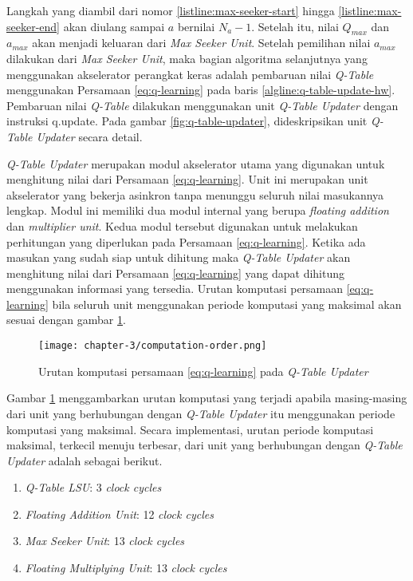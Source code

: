 Langkah yang diambil dari nomor \ref{listline:max-seeker-start} hingga \ref{listline:max-seeker-end} akan diulang sampai $a$ bernilai $N_a - 1$. Setelah itu, nilai $Q_{max}$ dan $a_{max}$ akan menjadi keluaran dari \textit{Max Seeker Unit}. Setelah pemilihan nilai $a_{max}$ dilakukan dari \textit{Max Seeker Unit}, maka bagian algoritma selanjutnya yang menggunakan akselerator perangkat keras adalah pembaruan nilai \textit{Q-Table} menggunakan Persamaan \ref{eq:q-learning} pada baris \ref{algline:q-table-update-hw}. Pembaruan nilai \textit{Q-Table} dilakukan menggunakan unit \textit{Q-Table Updater} dengan instruksi q.update. Pada gambar \ref{fig:q-table-updater}, dideskripsikan unit \textit{Q-Table Updater} secara detail.

\textit{Q-Table Updater} merupakan modul akselerator utama yang digunakan untuk menghitung nilai dari Persamaan \ref{eq:q-learning}. Unit ini merupakan unit akselerator yang bekerja asinkron tanpa menunggu seluruh nilai masukannya lengkap. Modul ini memiliki dua modul internal yang berupa \textit{floating addition} dan \textit{multiplier unit}. Kedua modul tersebut digunakan untuk melakukan perhitungan yang diperlukan pada Persamaan \ref{eq:q-learning}. Ketika ada masukan yang sudah siap untuk dihitung maka \textit{Q-Table Updater} akan menghitung nilai dari Persamaan \ref{eq:q-learning} yang dapat dihitung menggunakan informasi yang tersedia. Urutan komputasi persamaan \ref{eq:q-learning} bila seluruh unit menggunakan periode komputasi yang maksimal akan sesuai dengan gambar \ref{fig:computation-order}.

\begin{figure}[H]
	\centering
	\texttt{[image: chapter-3/computation-order.png]}
	\caption{Urutan komputasi persamaan \ref{eq:q-learning} pada \textit{Q-Table Updater}}
	\label{fig:computation-order}
\end{figure}

Gambar \ref{fig:computation-order} menggambarkan urutan komputasi yang terjadi apabila masing-masing dari unit yang berhubungan dengan \textit{Q-Table Updater} itu menggunakan periode komputasi yang maksimal. Secara implementasi, urutan periode komputasi maksimal, terkecil menuju terbesar, dari unit yang berhubungan dengan \textit{Q-Table Updater} adalah sebagai berikut.

\begin{enumerate}
	\item \textit{Q-Table \ac{LSU}}: 3 \textit{clock cycles}
	\item \textit{Floating Addition Unit}: 12 \textit{clock cycles}
	\item \textit{Max Seeker Unit}: 13 \textit{clock cycles}
	\item \textit{Floating Multiplying Unit}: 13 \textit{clock cycles}
\end{enumerate}

